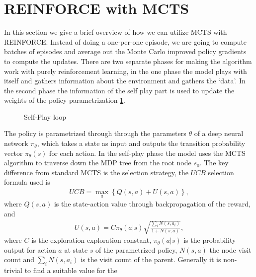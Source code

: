 \section{REINFORCE with MCTS\label{sec: gen}}
In this section we give a brief overview of how we can utilize MCTS with
REINFORCE. Instead of doing a one-per-one episode, we are going
to compute batches of episodes and average out the Monte
Carlo improved policy gradients to compute the updates. There are two
separate phases for making the algorithm work with purely reinforcement
learning, in the one phase the model plays with itself and gathers
information about the environment and gathers the `data'. In the second phase
the information of the self play part is used to update the weights of the
policy parametrization \ref{fig: 5}.
\begin{figure}[H]
    \centering
    \caption{Self-Play loop \label{fig: 5}}
\end{figure}
The policy is parametrized through through the parameters $\theta$ of a deep
neural network $\pi_\theta$, which takes a state as input and outputs the
transition probability vector $\pi_\theta(s)$ for each action. In the
self-play phase the model uses the MCTS algorithm to traverse down the MDP
tree from the root node $s_0$. The key difference from standard MCTS is
the selection strategy, the $UCB$ selection formula used is
\begin{align}
    UCB = \max_a \left\{Q(s,a) + U(s,a)\right\}, \label{eq: mod_ucb}
\end{align}
where $Q(s,a)$ is the state-action value through backpropagation of the
reward, and
\begin{align}
U(s,a)=C \pi_\theta(a|s)\sqrt{\frac{\sum_{i}N(s, a_i)}{1+N(s,a)}},
\end{align}
where $C$ is the exploration-exploration constant, $\pi_\theta(a|s)$ is the
probability output for action $a$ at state $s$ of the parametrized policy,
$N(s, a)$ the node visit count and $\sum_{i} N(s, a_i)$ is the visit count of
the parent. Generally it is non-trivial to find a suitable value for the
